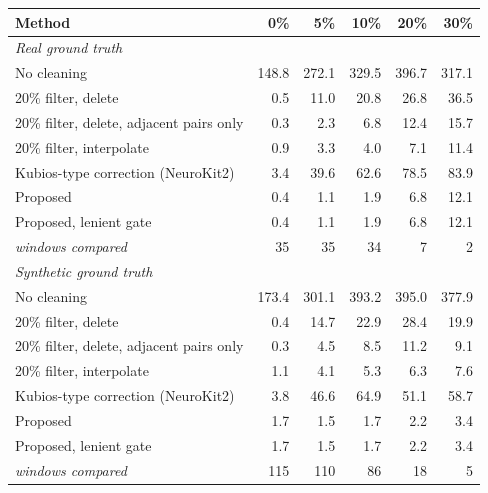 \begin{tabular}{lrrrrr}
\toprule
Method & 0\% & 5\% & 10\% & 20\% & 30\% \\
\midrule
\multicolumn{6}{l}{\textit{Real ground truth}} \\
No cleaning & 148.8 & 272.1 & 329.5 & 396.7 & 317.1 \\
20\% filter, delete & 0.5 & 11.0 & 20.8 & 26.8 & 36.5 \\
20\% filter, delete, adjacent pairs only & 0.3 & 2.3 & 6.8 & 12.4 & 15.7 \\
20\% filter, interpolate & 0.9 & 3.3 & 4.0 & 7.1 & 11.4 \\
Kubios-type correction (NeuroKit2) & 3.4 & 39.6 & 62.6 & 78.5 & 83.9 \\
Proposed & 0.4 & 1.1 & 1.9 & 6.8 & 12.1 \\
Proposed, lenient gate & 0.4 & 1.1 & 1.9 & 6.8 & 12.1 \\
\textit{windows compared} & 35 & 35 & 34 & 7 & 2 \\
\midrule
\multicolumn{6}{l}{\textit{Synthetic ground truth}} \\
No cleaning & 173.4 & 301.1 & 393.2 & 395.0 & 377.9 \\
20\% filter, delete & 0.4 & 14.7 & 22.9 & 28.4 & 19.9 \\
20\% filter, delete, adjacent pairs only & 0.3 & 4.5 & 8.5 & 11.2 & 9.1 \\
20\% filter, interpolate & 1.1 & 4.1 & 5.3 & 6.3 & 7.6 \\
Kubios-type correction (NeuroKit2) & 3.8 & 46.6 & 64.9 & 51.1 & 58.7 \\
Proposed & 1.7 & 1.5 & 1.7 & 2.2 & 3.4 \\
Proposed, lenient gate & 1.7 & 1.5 & 1.7 & 2.2 & 3.4 \\
\textit{windows compared} & 115 & 110 & 86 & 18 & 5 \\
\bottomrule
\end{tabular}
